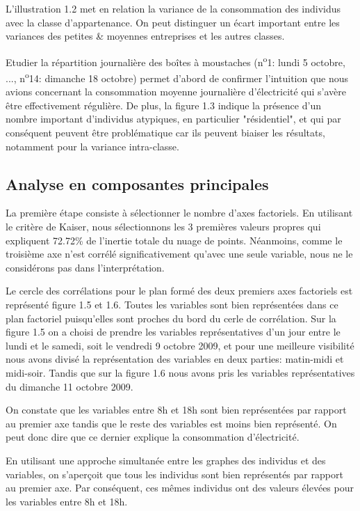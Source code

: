 L'illustration 1.2 met en relation la variance de la consommation des individus avec la classe d'appartenance. On peut distinguer un écart important entre les variances des petites \& moyennes entreprises et les autres classes.

Etudier la répartition journalière des boîtes à moustaches (n\textsuperscript{o}1: lundi 5 octobre, ..., n\textsuperscript{o}14: dimanche 18 octobre) permet d'abord de confirmer l'intuition que nous avions concernant la consommation moyenne journalière d'électricité qui s'avère être effectivement régulière. De plus, la figure 1.3 indique la présence d'un nombre important d'individus atypiques, en particulier "résidentiel", et qui par conséquent peuvent être problématique car ils peuvent biaiser les résultats, notamment pour la variance intra-classe.

\subsection{Analyse en composantes principales}

La première étape consiste à sélectionner le nombre d’axes factoriels. En utilisant le critère de Kaiser, nous sélectionnons les 3 premières valeurs propres qui expliquent 72.72\% de l’inertie totale du nuage de points. Néanmoins, comme le troisième axe n’est corrélé significativement qu’avec une seule variable, nous ne le considérons pas dans l’interprétation.

Le cercle des corrélations pour le plan formé des deux premiers axes factoriels est représenté figure 1.5 et 1.6. Toutes les variables sont bien représentées dans ce plan factoriel puisqu'elles sont proches du bord du cerle de corrélation. Sur la figure 1.5 on a choisi de prendre les variables représentatives d'un jour entre le lundi et le samedi, soit le vendredi 9 octobre 2009, et pour une meilleure visibilité nous avons divisé la représentation des variables en deux parties: matin-midi et midi-soir. Tandis que sur la figure 1.6 nous avons pris les variables représentatives du dimanche 11 octobre 2009.

On constate que les variables entre 8h et 18h sont bien représentées par rapport au premier axe tandis que le reste des variables est moins bien représenté. On peut donc dire que ce dernier explique la consommation d'électricité.

En utilisant une approche simultanée entre les graphes des individus et des variables, on s'aperçoit que tous les individus sont bien représentés par rapport au premier axe. Par conséquent, ces mêmes individus ont des valeurs élevées pour les variables entre 8h et 18h.

